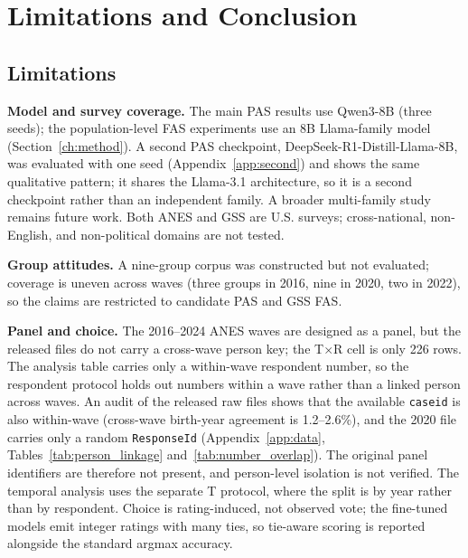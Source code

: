 \chapter{Limitations and Conclusion}
\label{ch:conclusion}

\section{Limitations}

\textbf{Model and survey coverage.} The main PAS results use Qwen3-8B (three
seeds); the population-level FAS experiments use an 8B Llama-family model
(Section~\ref{ch:method}). A second PAS checkpoint,
DeepSeek-R1-Distill-Llama-8B, was evaluated with one seed
(Appendix~\ref{app:second}) and shows the same qualitative pattern; it shares the
Llama-3.1 architecture, so it is a second checkpoint rather than an independent
family. A broader multi-family study remains future work. Both ANES and GSS are
U.S. surveys; cross-national, non-English, and non-political domains are not
tested.

\textbf{Group attitudes.} A nine-group corpus was constructed but not evaluated;
coverage is uneven across waves (three groups in 2016, nine in 2020, two in 2022),
so the claims are restricted to candidate PAS and GSS FAS.

\textbf{Panel and choice.} The 2016--2024 ANES waves are designed as a panel,
but the released files do not carry a cross-wave person key; the T$\times$R cell
is only 226 rows. The analysis table carries only a within-wave respondent
number, so the respondent protocol holds out numbers within a wave rather than a
linked person across waves. An audit of the released raw files shows that the
available \texttt{caseid} is also within-wave (cross-wave birth-year agreement is
1.2--2.6\%), and the 2020 file carries only a random \texttt{ResponseId}
(Appendix~\ref{app:data}, Tables~\ref{tab:person_linkage}
and~\ref{tab:number_overlap}). The original panel identifiers are therefore not
present, and person-level isolation is not verified. The temporal analysis uses
the separate T protocol, where the split
is by year rather than by respondent. Choice is rating-induced, not observed vote;
the fine-tuned models emit integer ratings with many ties, so tie-aware scoring
is reported alongside the standard argmax accuracy.

